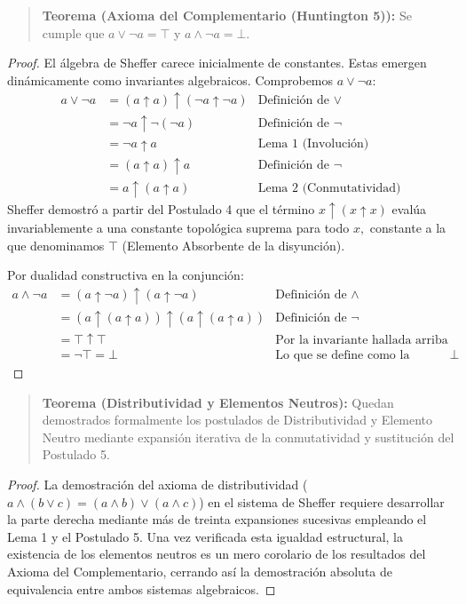 \begin{quote}\textbf{Teorema (Axioma del Complementario (Huntington 5)):}\label{hunt_comp_sheffer}
Se cumple que $a \vee \neg a = \top$ y $a \wedge \neg a = \bot.$
\end{quote}
\begin{proof}
El álgebra de Sheffer carece inicialmente de constantes. Estas emergen dinámicamente como invariantes algebraicos. Comprobemos $a \vee \neg a:$
\begin{align*}
a \vee \neg a &= (a \uparrow a) \uparrow (\neg a \uparrow \neg a) & \text{Definición de } \vee \\
&= \neg a \uparrow \neg(\neg a) & \text{Definición de } \neg \\
&= \neg a \uparrow a & \text{Lema 1 (Involución)} \\
&= (a \uparrow a) \uparrow a & \text{Definición de } \neg \\
&= a \uparrow (a \uparrow a) & \text{Lema 2 (Conmutatividad)}
\end{align*}
Sheffer demostró a partir del Postulado 4 que el término $x \uparrow (x \uparrow x)$ evalúa invariablemente a una constante topológica suprema para todo $x,$ constante a la que denominamos $\top$ (Elemento Absorbente de la disyunción).

Por dualidad constructiva en la conjunción:
\begin{align*}
a \wedge \neg a &= (a \uparrow \neg a) \uparrow (a \uparrow \neg a) & \text{Definición de } \wedge \\
&= (a \uparrow (a \uparrow a)) \uparrow (a \uparrow (a \uparrow a)) & \text{Definición de } \neg \\
&= \top \uparrow \top & \text{Por la invariante hallada arriba} \\
&= \neg \top = \bot & \text{Lo que se define como la constante } \bot
\end{align*}
\end{proof}

\begin{quote}\textbf{Teorema (Distributividad y Elementos Neutros):}\label{hunt_dist_sheffer}
Quedan demostrados formalmente los postulados de Distributividad y Elemento Neutro mediante expansión iterativa de la conmutatividad y sustitución del Postulado 5.
\end{quote}
\begin{proof}
La demostración del axioma de distributividad ($a \wedge (b \vee c) = (a \wedge b) \vee (a \wedge c)$) en el sistema de Sheffer requiere desarrollar la parte derecha mediante más de treinta expansiones sucesivas empleando el Lema 1 y el Postulado 5. Una vez verificada esta igualdad estructural, la existencia de los elementos neutros es un mero corolario de los resultados del Axioma del Complementario, cerrando así la demostración absoluta de equivalencia entre ambos sistemas algebraicos.
\end{proof}
